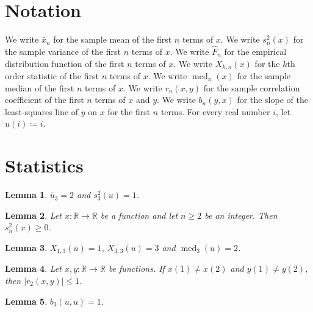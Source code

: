 \documentclass{article}
\newtheorem{lemma}{Lemma}
\begin{document}
\section{Notation}

We write $\bar x_n$ for the sample mean of the first $n$ terms of $x$.
We write $s_n^2(x)$ for the sample variance of the first $n$ terms of $x$.
We write $\hat F_n$ for the empirical distribution function of the first $n$ terms of $x$.
We write $X_{k,n}(x)$ for the $k$th order statistic of the first $n$ terms of $x$.
We write $\operatorname{med}_n(x)$ for the sample median of the first $n$ terms of $x$.
We write $r_n(x,y)$ for the sample correlation coefficient of the first $n$ terms of $x$ and $y$.
We write $b_n(y,x)$ for the slope of the least-squares line of $y$ on $x$ for the first $n$ terms.
For every real number $i$, let $u(i)\coloneqq i$.

\section{Statistics}

\begin{lemma}\label{mean}
$\bar u_3=2$ and $s_3^2(u)=1$.
\end{lemma}

\begin{lemma}\label{variance}
Let $x:\mathbb{R}\to\mathbb{R}$ be a function and let $n\ge2$ be an integer. Then $s_n^2(x)\ge0$.
\end{lemma}

\begin{lemma}\label{order}
$X_{1,3}(u)=1$, $X_{3,3}(u)=3$ and $\operatorname{med}_3(u)=2$.
\end{lemma}

\begin{lemma}\label{correlation}
Let $x,y:\mathbb{R}\to\mathbb{R}$ be functions. If $x(1)\ne x(2)$ and $y(1)\ne y(2)$, then $|r_2(x,y)|\le1$.
\end{lemma}

\begin{lemma}\label{slope}
$b_3(u,u)=1$.
\end{lemma}
\end{document}
